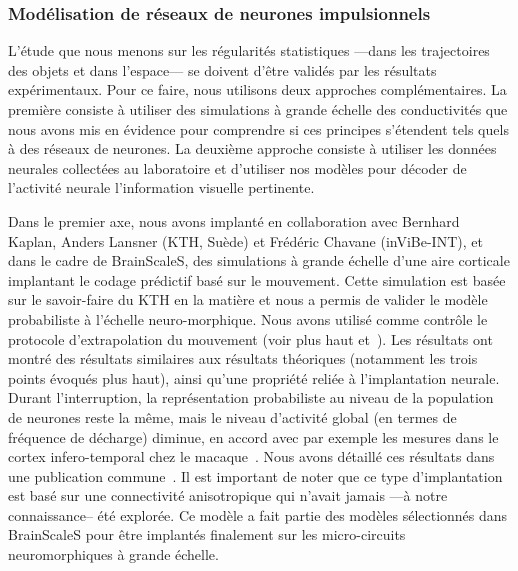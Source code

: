 \subsubsection{Modélisation de réseaux de neurones impulsionnels}%
\label{sec:spikes_neopto}
L'étude que nous menons sur les régularités statistiques ---dans les trajectoires des objets et dans l'espace--- se doivent d'être validés par les résultats expérimentaux. Pour ce faire, nous utilisons deux approches complémentaires. La première consiste à utiliser des simulations à grande échelle des conductivités que nous avons mis en évidence pour comprendre si ces principes s'étendent tels quels à des réseaux de neurones. La deuxième approche consiste à utiliser les données neurales collectées au laboratoire et d'utiliser nos modèles pour décoder de l'activité neurale l'information visuelle pertinente.

Dans le premier axe, nous avons implanté en collaboration avec Bernhard Kaplan, Anders Lansner (KTH, Suède) et Frédéric Chavane (inViBe-INT), et dans le cadre de BrainScaleS, des simulations à grande échelle d'une aire corticale implantant le codage prédictif basé sur le mouvement. Cette simulation est basée sur le savoir-faire du KTH en la matière et nous a permis de valider le modèle probabiliste à l'échelle neuro-morphique. Nous avons utilisé comme contrôle le protocole d'extrapolation du mouvement (voir plus haut et~\citep{Khoei13jpp}). Les résultats ont montré des résultats similaires aux résultats théoriques (notamment les trois points évoqués plus haut), ainsi qu'une propriété reliée à l'implantation neurale. Durant l'interruption, la représentation probabiliste au niveau de la population de neurones reste la même, mais le niveau d'activité global (en termes de fréquence de décharge) diminue, en accord avec par exemple les mesures dans le cortex infero-temporal chez le macaque~\citep{Assad95}. Nous avons détaillé ces résultats dans une publication commune~\citep{KaplanKhoei14}. Il est important de noter que ce type d'implantation est basé sur une connectivité anisotropique qui n'avait jamais ---à notre connaissance-- été explorée. Ce modèle a fait partie des modèles sélectionnés dans BrainScaleS pour être implantés finalement sur les micro-circuits neuromorphiques à grande échelle.


